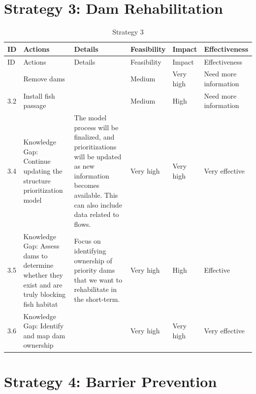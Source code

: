 \documentclass[
  letterpaper,
  DIV=11,
  numbers=noendperiod]{scrreprt}
\begin{document}
\hypertarget{strategy-3-dam-rehabilitation}{%
\section*{Strategy 3: Dam
Rehabilitation}\label{strategy-3-dam-rehabilitation}}


\hypertarget{tbl-S3}{}
\begin{longtable}[]{@{}llllll@{}}
\caption{\label{tbl-S3}Strategy 3}\label{T_6223c}\tabularnewline
\toprule\noalign{}
ID & Actions & Details & Feasibility & Impact & Effectiveness \\
\midrule\noalign{}
\endfirsthead
\toprule\noalign{}
ID & Actions & Details & Feasibility & Impact & Effectiveness \\
\midrule\noalign{}
\endhead
\bottomrule\noalign{}
\endlastfoot
3.1 & Remove dams & & Medium & Very high & Need more information \\
3.2 & Install fish passage & & Medium & High & Need more information \\
3.4 & Knowledge Gap: Continue updating the structure prioritization
model & The model process will be finalized, and prioritizations will be
updated as new information becomes available. This can also include data
related to flows. & Very high & Very high & Very effective \\
3.5 & Knowledge Gap: Assess dams to determine whether they exist and are
truly blocking fish habitat & Focus on identifying ownership of priority
dams that we want to rehabilitate in the short-term. & Very high & High
& Effective \\
3.6 & Knowledge Gap: Identify and map dam ownership & & Very high & Very
high & Very effective \\
\end{longtable}

\hypertarget{strategy-4-barrier-prevention}{%
\section*{Strategy 4: Barrier
Prevention}\label{strategy-4-barrier-prevention}}

\end{document}
